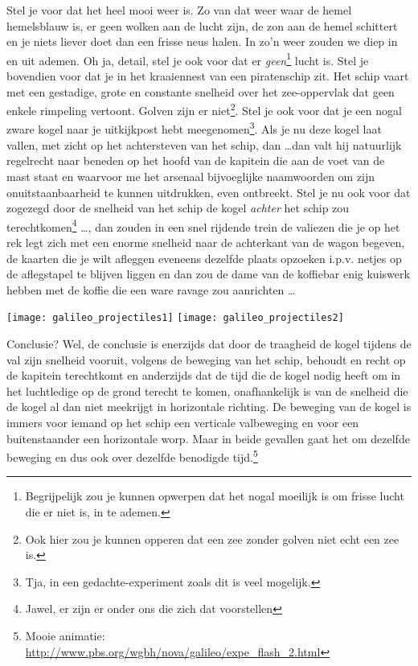 \documentclass{ximera}
\begin{document}
	Stel je voor dat het heel mooi weer is. Zo van dat weer waar de hemel hemelsblauw is, er geen wolken aan de lucht zijn, de zon aan de hemel schittert en je niets liever doet dan een frisse neus halen. In zo'n weer zouden we diep in en uit ademen. Oh ja, detail, stel je ook voor dat er \emph{geen}\footnote{Begrijpelijk zou je kunnen opwerpen dat het nogal moeilijk is om frisse lucht die er niet is, in te ademen.} lucht is. Stel je bovendien voor dat je in het kraaiennest van een piratenschip zit. Het schip vaart met een gestadige, grote en constante snelheid over het zee-oppervlak dat geen enkele rimpeling vertoont. Golven zijn er niet\footnote{Ook hier zou je kunnen opperen dat een zee zonder golven niet echt een zee is.}. Stel je ook voor dat je een nogal zware kogel naar je uitkijkpost hebt meegenomen\footnote{Tja, in een gedachte-experiment zoals dit is veel mogelijk.}. Als je nu deze kogel laat vallen, met zicht op het achtersteven van het schip, dan \ldots dan valt hij natuurlijk regelrecht naar beneden op het hoofd van de kapitein die aan de voet van de mast staat en waarvoor me het arsenaal bijvoeglijke naamwoorden om zijn onuitstaanbaarheid te kunnen uitdrukken, even ontbreekt. Stel je nu ook voor dat zogezegd door de snelheid van het schip de kogel \emph{achter} het schip zou terechtkomen\footnote{Jawel, er zijn er onder ons die zich dat voorstellen} \ldots, dan zouden in een snel rijdende trein de valiezen die je op het rek legt zich met een enorme snelheid naar de achterkant van de wagon begeven, de kaarten die je wilt afleggen eveneens dezelfde plaats opzoeken i.p.v. netjes op de  aflegstapel te blijven liggen en dan zou de dame van de koffiebar enig kuiswerk hebben met de koffie die een ware ravage zou aanrichten \ldots 
	\begin{image}
	
	\texttt{[image: galileo\_projectiles1]} 
	\texttt{[image: galileo\_projectiles2]} 
	\end{image}
	
	Conclusie? Wel, de conclusie is enerzijds dat door de traagheid de kogel tijdens de val zijn snelheid vooruit, volgens de beweging van het schip, behoudt en recht op de kapitein terechtkomt en anderzijds dat de tijd die de kogel nodig heeft om in het luchtledige op de grond terecht te komen, onafhankelijk is van de snelheid die de kogel al dan niet meekrijgt in horizontale richting. De beweging van de kogel is immers voor iemand op het schip een verticale valbeweging en voor een buitenstaander een horizontale worp. Maar in beide gevallen gaat het om dezelfde beweging en dus ook over dezelfde benodigde tijd.\footnote{Mooie animatie: \url{http://www.pbs.org/wgbh/nova/galileo/expe_flash_2.html}}
	
	
	
\end{document}
